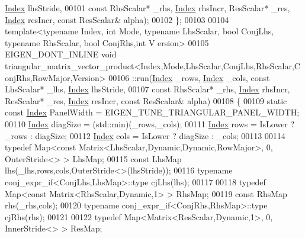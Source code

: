 \begin{DoxyCode}
      \hyperlink{namespace_eigen_a62e77e0933482dafde8fe197d9a2cfde}{Index} lhsStride,
00101                                     \textcolor{keyword}{const} RhsScalar* \_rhs, \hyperlink{namespace_eigen_a62e77e0933482dafde8fe197d9a2cfde}{Index} rhsIncr, ResScalar* \_res, 
      \hyperlink{namespace_eigen_a62e77e0933482dafde8fe197d9a2cfde}{Index} resIncr, \textcolor{keyword}{const} ResScalar& alpha);
00102 \};
00103 
00104 \textcolor{keyword}{template}<\textcolor{keyword}{typename} Index, \textcolor{keywordtype}{int} Mode, \textcolor{keyword}{typename} LhsScalar, \textcolor{keywordtype}{bool} ConjLhs, \textcolor{keyword}{typename} RhsScalar, \textcolor{keywordtype}{bool} ConjRhs,\textcolor{keywordtype}{int} V
      ersion>
00105 EIGEN\_DONT\_INLINE \textcolor{keywordtype}{void} 
      triangular\_matrix\_vector\_product<Index,Mode,LhsScalar,ConjLhs,RhsScalar,ConjRhs,RowMajor,Version>
00106   ::run(\hyperlink{namespace_eigen_a62e77e0933482dafde8fe197d9a2cfde}{Index} \_rows, \hyperlink{namespace_eigen_a62e77e0933482dafde8fe197d9a2cfde}{Index} \_cols, \textcolor{keyword}{const} LhsScalar* \_lhs, \hyperlink{namespace_eigen_a62e77e0933482dafde8fe197d9a2cfde}{Index} lhsStride,
00107         \textcolor{keyword}{const} RhsScalar* \_rhs, \hyperlink{namespace_eigen_a62e77e0933482dafde8fe197d9a2cfde}{Index} rhsIncr, ResScalar* \_res, \hyperlink{namespace_eigen_a62e77e0933482dafde8fe197d9a2cfde}{Index} resIncr, \textcolor{keyword}{const} ResScalar& 
      alpha)
00108   \{
00109     \textcolor{keyword}{static} \textcolor{keyword}{const} \hyperlink{namespace_eigen_a62e77e0933482dafde8fe197d9a2cfde}{Index} PanelWidth = EIGEN\_TUNE\_TRIANGULAR\_PANEL\_WIDTH;
00110     \hyperlink{namespace_eigen_a62e77e0933482dafde8fe197d9a2cfde}{Index} diagSize = (std::min)(\_rows,\_cols);
00111     \hyperlink{namespace_eigen_a62e77e0933482dafde8fe197d9a2cfde}{Index} rows = IsLower ? \_rows : diagSize;
00112     \hyperlink{namespace_eigen_a62e77e0933482dafde8fe197d9a2cfde}{Index} cols = IsLower ? diagSize : \_cols;
00113 
00114     \textcolor{keyword}{typedef} Map<const Matrix<LhsScalar,Dynamic,Dynamic,RowMajor>, 0, OuterStride<> > LhsMap;
00115     \textcolor{keyword}{const} LhsMap lhs(\_lhs,rows,cols,OuterStride<>(lhsStride));
00116     \textcolor{keyword}{typename} conj\_expr\_if<ConjLhs,LhsMap>::type cjLhs(lhs);
00117 
00118     \textcolor{keyword}{typedef} Map<const Matrix<RhsScalar,Dynamic,1> > RhsMap;
00119     \textcolor{keyword}{const} RhsMap rhs(\_rhs,cols);
00120     \textcolor{keyword}{typename} conj\_expr\_if<ConjRhs,RhsMap>::type cjRhs(rhs);
00121 
00122     \textcolor{keyword}{typedef} Map<Matrix<ResScalar,Dynamic,1>, 0, InnerStride<> > ResMap;

\end{DoxyCode}
